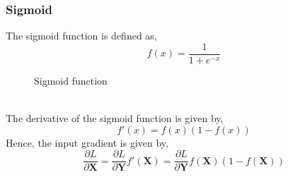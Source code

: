 \documentclass[11pt]{article}
\theoremstyle{definition}
\begin{document}
\subsubsection{Sigmoid}
The sigmoid function is defined as,
\begin{equation}
    f(x) = \frac{1}{1 + e^{-x}}
\end{equation}
\begin{figure}[h]
    \centering
    \caption{Sigmoid function}
    \label{fig:sigmoid}
\end{figure}\\
The derivative of the sigmoid function is given by,
\begin{equation}
    f'(x) = f(x)(1 - f(x))
\end{equation}
Hence, the input gradient is given by,
\begin{equation}
    \frac{\partial L}{\partial \mathbf{X}} = 
    \frac{\partial L}{\partial \mathbf{Y}} f'(\mathbf{X}) = 
    \frac{\partial L}{\partial \mathbf{Y}} f(\mathbf{X})(1 - f(\mathbf{X}))
\end{equation}
\end{document}

